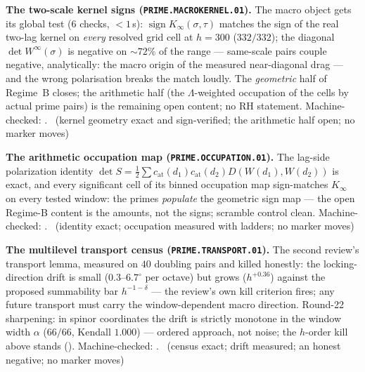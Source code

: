 \par\smallskip\noindent\textbf{The two-scale kernel signs
(\texttt{PRIME.MACROKERNEL.01}).}
The macro object gets its global test ($6$ checks, ${<}1$\,s):
$\operatorname{sign}K_\infty(\sigma,\tau)$ matches the sign of the real
two-lag kernel on \emph{every} resolved grid cell at $h=300$ ($332/332$);
the diagonal $\det W^\infty(\sigma)$ is negative on ${\sim}72\%$ of the
range --- same-scale pairs couple negative, analytically: the macro
origin of the measured near-diagonal drag --- and the wrong polarisation
breaks the match loudly. The \emph{geometric} half of Regime~B closes;
the arithmetic half (the $\Lambda$-weighted occupation of the cells by
actual prime pairs) is the remaining open content; no RH statement.
Machine-checked: .
\mE\ (kernel geometry exact and sign-verified; the arithmetic half open;
no marker moves)
\par\smallskip


\par\smallskip\noindent\textbf{The arithmetic occupation map
(\texttt{PRIME.OCCUPATION.01}).}
The lag-side polarization identity $\det S=\tfrac12\sum
c_{\mathrm{at}}(d_1)c_{\mathrm{at}}(d_2)D(W(d_1),W(d_2))$ is exact, and
every significant cell of its binned occupation map sign-matches
$K_\infty$ on every tested window: the primes \emph{populate} the
geometric sign map --- the open Regime-B content is the amounts, not the
signs; scramble control clean. Machine-checked:
.
\mE\ (identity exact; occupation measured with ladders; no marker moves)
\par\smallskip


\par\smallskip\noindent\textbf{The multilevel transport census
(\texttt{PRIME.TRANSPORT.01}).}
The second review's transport lemma, measured on $40$ doubling pairs and
killed honestly: the locking-direction drift is small
($0.3$--$6.7^\circ$ per octave) but grows ($h^{+0.36}$) against the
proposed summability bar $h^{-1-\delta}$ --- the review's own kill
criterion fires; any future transport must carry the window-dependent
macro direction.  Round-22 sharpening: in spinor coordinates the
drift is strictly monotone in the window width $\alpha$ ($66/66$,
Kendall $1.000$) --- ordered approach, not noise; the $h$-order kill
above stands ().
Machine-checked: .
\mE\ (census exact; drift measured; an honest negative; no marker moves)
\par\smallskip


